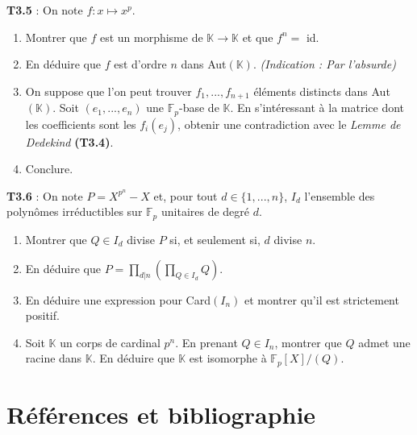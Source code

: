 \documentclass[5pt,a4paper]{article}
\begin{document}
\begin{onehalfspacing}
\textbf{T3.5} : On note $f : x \mapsto x^p$.
\begin{enumerate}
	\item Montrer que $f$ est un morphisme de $\mathbb{K} \rightarrow \mathbb{K}$ et que $f^n =$ id. 
	\item En déduire que $f$ est d'ordre $n$ dans Aut$(\mathbb{K})$. \textit{(Indication : Par l'absurde)}
	\item On suppose que l'on peut trouver $f_1, ..., f_{n+1}$ éléments distincts dans Aut$(\mathbb{K})$. Soit $(e_1, ..., e_n)$ une $\mathbb{F}_p$-base de $\mathbb{K}$. En s'intéressant à la matrice dont les coefficients sont les $f_i(e_j)$, obtenir une contradiction avec le \textit{Lemme de Dedekind} \textbf{(T3.4)}.
	\item Conclure.
\end{enumerate}

\textbf{T3.6} : On note $P = X^{p^n} - X$ et, pour tout $d \in \{1, ..., n\}$, $I_d$ l'ensemble des polynômes irréductibles sur $\mathbb{F}_p$ unitaires de degré $d$.
\begin{enumerate}
	\item Montrer que $Q \in I_d$ divise $P$ si, et seulement si, $d$ divise $n$.
	\item En déduire que $P = \prod_{d | n} (\prod_{Q \in I_d} Q)$.
	\item En déduire une expression pour Card$(I_n)$ et montrer qu'il est strictement positif.
	\item Soit $\mathbb{K}$ un corps de cardinal $p^n$. En prenant $Q \in I_n$, montrer que $Q$ admet une racine dans $\mathbb{K}$. En déduire que $\mathbb{K}$ est isomorphe à $\mathbb{F}_p[X]/(Q)$.
\end{enumerate}

\newpage
\section{Références et bibliographie}


\end{onehalfspacing}
\end{document}
